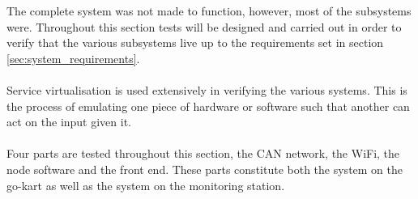 The complete system was not made to function, however, most of the subsystems were.
Throughout this section tests will be designed and carried out in order to verify that the various subsystems live up to the requirements set in section \ref{sec:system_requirements}.
\\~\\
Service virtualisation is used extensively in verifying the various systems.
This is the process of emulating one piece of hardware or software such that another can act on the input given it.
\\~\\
Four parts are tested throughout this section, the CAN network, the WiFi, the node software and the front end.
These parts constitute both the system on the go-kart as well as the system on the monitoring station.





